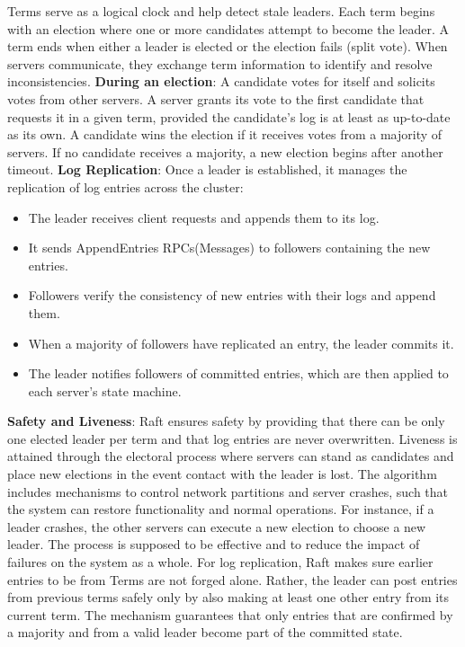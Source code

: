 \documentclass[a4paper]{llncs}
\begin{document}
    Terms serve as a logical clock and help detect stale leaders. Each term begins
    with an election where one or more candidates attempt to become the leader. A
    term ends when either a leader is elected or the election fails (split vote).
    When servers communicate, they exchange term information to identify and
    resolve inconsistencies.
    \newline
    \textbf{During an election}: A candidate votes for itself and solicits votes from
    other servers. A server grants its vote to the first candidate that requests it
    in a given term, provided the candidate's log is at least as up-to-date as
    its own. A candidate wins the election if it receives votes from a majority
    of servers. If no candidate receives a majority, a new election begins after another
    timeout.
    \newline
    \textbf{Log Replication}: Once a leader is established, it manages the
    replication of log entries across the cluster:
    \begin{itemize}
        \item The leader receives client requests and appends them to its log.

        \item It sends AppendEntries RPCs(Messages) to followers containing the new entries.

        \item Followers verify the consistency of new entries with their logs and
            append them.

        \item When a majority of followers have replicated an entry, the leader
            commits it.

        \item The leader notifies followers of committed entries, which are then
            applied to each server's state machine.
    \end{itemize}
    \textbf{Safety and Liveness}: Raft ensures safety by providing
that there can be only one elected leader per term and that log
entries are never overwritten. Liveness is attained through
the electoral process where servers can stand as candidates and
place new elections in the event contact with the leader is lost.
The algorithm includes mechanisms to control network
partitions and server crashes, such that the system can
restore functionality and normal operations. For instance, if a
leader crashes, the other servers can execute a new election
to choose a new leader. The process is supposed to be effective
and to reduce the impact of failures on the system as a whole.
For log replication, Raft makes sure earlier entries to be from
Terms are not forged alone. Rather, the leader
can post entries from previous terms safely only by also
making at least one other entry from its current term. The
mechanism guarantees that only entries that are confirmed by a
majority and from a valid leader become part of the committed
state.
\end{document}

